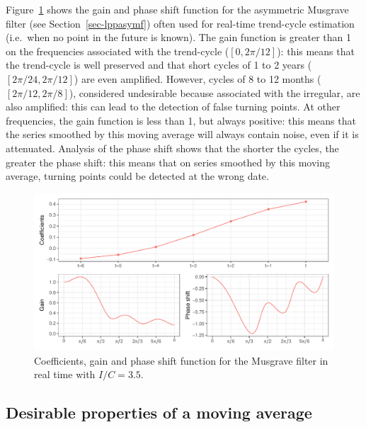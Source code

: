 \documentclass[
]{article}
\newcommand\1{\mathds{1}}
\begin{document}
Figure~\ref{fig-graphsmusgrave} shows the gain and phase shift function
for the asymmetric Musgrave filter (see Section~\ref{sec-lppasymf})
often used for real-time trend-cycle estimation (i.e.~when no point in
the future is known). The gain function is greater than 1 on the
frequencies associated with the trend-cycle (\([0, 2\pi/12]\)): this
means that the trend-cycle is well preserved and that short cycles of 1
to 2 years (\([2\pi/24,2\pi/12]\)) are even amplified. However, cycles
of 8 to 12 months (\([2\pi/12, 2\pi/8]\)), considered undesirable
because associated with the irregular, are also amplified: this can lead
to the detection of false turning points. At other frequencies, the gain
function is less than 1, but always positive: this means that the series
smoothed by this moving average will always contain noise, even if it is
attenuated. Analysis of the phase shift shows that the shorter the
cycles, the greater the phase shift: this means that on series smoothed
by this moving average, turning points could be detected at the wrong
date.

\begin{figure}[H]

\caption{\label{fig-graphsmusgrave}Coefficients, gain and phase shift
function for the Musgrave filter in real time with \(I/C=3.5\).}

{\centering \includegraphics[width=1\textwidth,height=\textheight]{img/filters_used/musgrave.pdf}

}

\end{figure}

\hypertarget{desirable-properties-of-a-moving-average}{%
\subsection{Desirable properties of a moving
average}\label{desirable-properties-of-a-moving-average}}
\end{document}
